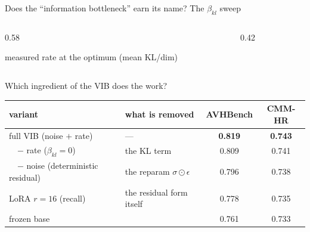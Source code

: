 \documentclass[aspectratio=169,11pt]{beamer}
\begin{document}
\begin{frame}{Does the ``information bottleneck'' earn its name? The $\beta_{kl}$ sweep}
\begin{columns}[T]
\begin{column}{0.58\textwidth}
\centering
{}
{\scriptsize measured rate at the optimum (mean KL/dim)}
\end{column}
\begin{column}{0.42\textwidth}\small

\end{column}
\end{columns}
\end{frame}

\begin{frame}{Which ingredient of the VIB does the work?}
\centering
\renewcommand{\arraystretch}{1.25}
\small
\begin{tabular}{l l cc}
\toprule
variant & what is removed & AVHBench & CMM-HR \\
\midrule
full VIB (noise $+$ rate)          & ---                          & \textbf{0.819} & \textbf{0.743} \\
\ \ $-$ rate ($\beta_{kl}{=}0$)    & the KL term                  & 0.809 & 0.741 \\
\ \ $-$ noise (deterministic residual) & the reparam $\sigma\odot\epsilon$ & 0.796 & 0.738 \\
LoRA $r{=}16$ (recall)             & the residual form itself     & 0.778 & 0.735 \\
frozen base                        &                              & 0.761 & 0.733 \\
\bottomrule
\end{tabular}
\vfill

\end{frame}
\end{document}
